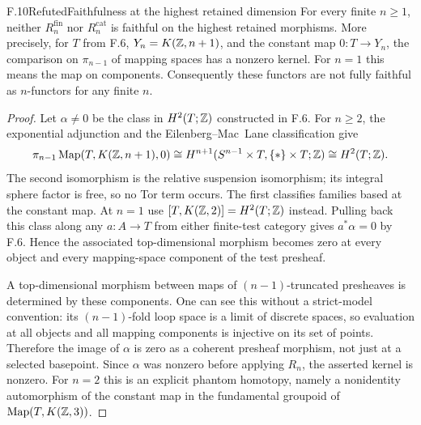 \begin{claim}{F.10}{Refuted}{Faithfulness at the highest retained dimension}
For every finite $n\geq1$, neither $R_n^{\mathrm{fin}}$ nor
$R_n^{\mathrm{cat}}$ is faithful on the highest retained
morphisms. More precisely, for $T$ from F.6, $Y_n=K(\mathbb Z,n+1)$,
and the constant map $0:T\to Y_n$, the comparison on
$\pi_{n-1}$ of mapping spaces has a nonzero kernel. For $n=1$
this means the map on components. Consequently these functors
are not fully faithful as $n$-functors for any finite $n$.
\end{claim}
\begin{proof}
Let $\alpha\ne0$ be the class in $H^2(T;\mathbb Z)$ constructed in F.6.
For $n\geq2$, the exponential adjunction and the Eilenberg--Mac~Lane
classification give
\[
 \pi_{n-1}\operatorname{Map}(T,K(\mathbb Z,n+1),0)
   \cong H^{n+1}(S^{n-1}\times T,\{*\}\times T;\mathbb Z)
   \cong H^2(T;\mathbb Z).
\]
The second isomorphism is the relative suspension isomorphism;
its integral sphere factor is free, so no Tor term occurs. The
first classifies families based at the constant map. At $n=1$
use $[T,K(\mathbb Z,2)]=H^2(T;\mathbb Z)$ instead. Pulling back this class
along any $a:A\to T$ from either finite-test category gives
$a^*\alpha=0$ by F.6. Hence the associated top-dimensional
morphism becomes zero at every object and every mapping-space
component of the test presheaf.

A top-dimensional morphism between maps of $(n-1)$-truncated
presheaves is determined by these components. One can see this
without a strict-model convention: its $(n-1)$-fold loop space
is a limit of discrete spaces, so evaluation at all objects and
all mapping components is injective on its set of points.
Therefore the image of $\alpha$ is zero as a coherent
presheaf morphism, not just at a selected basepoint. Since
$\alpha$ was nonzero before applying $R_n$, the asserted kernel
is nonzero. For $n=2$ this is an explicit phantom homotopy,
namely a nonidentity automorphism of the constant map in the
fundamental groupoid of $\operatorname{Map}(T,K(\mathbb Z,3))$.
\end{proof}

